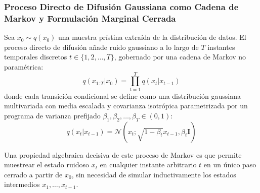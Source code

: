\subsubsection{Proceso Directo de Difusión Gaussiana como Cadena de Markov y Formulación Marginal Cerrada}

Sea $x_0 \sim q(x_0)$ una muestra prístina extraída de la distribución de datos. El proceso directo de difusión añade ruido gaussiano a lo largo de $T$ instantes temporales discretos $t \in \{1, 2, \dots, T\}$, gobernado por una cadena de Markov no paramétrica:
\begin{equation}
q(x_{1:T} | x_0) = \prod_{t=1}^T q(x_t | x_{t-1})
\end{equation}
donde cada transición condicional se define como una distribución gaussiana multivariada con media escalada y covarianza isotrópica parametrizada por un programa de varianza prefijado $\beta_1, \beta_2, \dots, \beta_T \in (0, 1)$:
\begin{equation}
q(x_t | x_{t-1}) = \mathcal{N}\left( x_t; \sqrt{1 - \beta_t} x_{t-1}, \beta_t \mathbf{I} \right)
\end{equation}

Una propiedad algebraica decisiva de este proceso de Markov es que permite muestrear el estado ruidoso $x_t$ en cualquier instante arbitrario $t$ en un único paso cerrado a partir de $x_0$, sin necesidad de simular inductivamente los estados intermedios $x_1, \dots, x_{t-1}$. 

